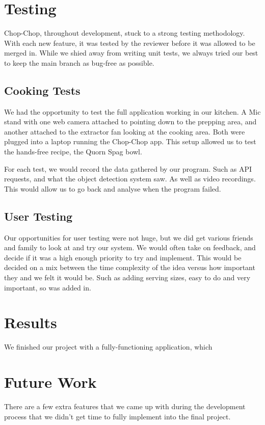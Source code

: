 \documentclass{article}
\begin{document}
\section{Testing}
Chop-Chop, throughout development, stuck to a strong testing methodology. With
each new feature, it was tested by the reviewer before it was allowed to be
merged in. While we shied away from writing unit tests, we always tried our
best to keep the main branch as bug-free as possible.

\subsection{Cooking Tests}
We had the opportunity to test the full application working in our kitchen. A
Mic stand with one web camera attached to pointing down to the prepping area,
and another attached to the extractor fan looking at the cooking area. Both
were plugged into a laptop running the Chop-Chop app. This setup allowed us to
test the hands-free recipe, the Quorn Spag bowl.

For each test, we would record the data gathered by our program. Such as API
requests, and what the object detection system saw. As well as video
recordings. This would allow us to go back and analyse when the program failed.

\subsection{User Testing}
Our opportunities for user testing were not huge, but we did get various
friends and family to look at and try our system. We would often take on
feedback, and decide if it was a high enough priority to try and implement.
This would be decided on a mix between the time complexity of the idea versus
how important they and we felt it would be. Such as adding serving sizes, easy
to do and very important, so was added in.

\section{Results}
We finished our project with a fully-functioning application, which

\section{Future Work}
There are a few extra features that we came up with during the development
process that we didn’t get time to fully implement into the final project.
\end{document}
